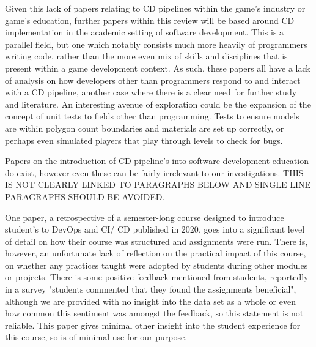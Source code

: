 \documentclass[journal]{IEEEtran}
\begin{document}
Given this lack of papers relating to CD pipelines within the game's industry or game's education, further papers within this review will be based around CD implementation in the academic setting of software development. This is a parallel field, but one which notably consists much more heavily of programmers writing code, rather than the more even mix of skills and disciplines that is present within a game development context. As such, these papers all have a lack of analysis on how developers other than programmers respond to and interact with a CD pipeline, another case where there is a clear need for further study and literature. An interesting avenue of exploration could be the expansion of the concept of unit tests to fields other than programming. Tests to ensure models are within polygon count boundaries and materials are set up correctly, or perhaps even simulated players that play through levels to check for bugs\cite{gordillo2021improving}.

Papers on the introduction of CD pipeline's into software development education do exist, however even these can be fairly irrelevant to our investigations. THIS IS NOT CLEARLY LINKED TO PARAGRAPHS BELOW AND SINGLE LINE PARAGRAPHS SHOULD BE AVOIDED.

One paper, a retrospective of a semester-long course designed to introduce student's to DevOps and CI/ CD published in 2020\cite{introdevops}, goes into a significant level of detail on how their course was structured and assignments were run. There is, however, an unfortunate lack of reflection on the practical impact of this course, on whether any practices taught were adopted by students during other modules or projects. There is some positive feedback mentioned from students, reportedly in a survey "students commented that they found the assignments beneficial"\cite[p.88]{introdevops}, although we are provided with no insight into the data set as a whole or even how common this sentiment was amongst the feedback, so this statement is not reliable. This paper gives minimal other insight into the student experience for this course, so is of minimal use for our purpose.
\end{document}
